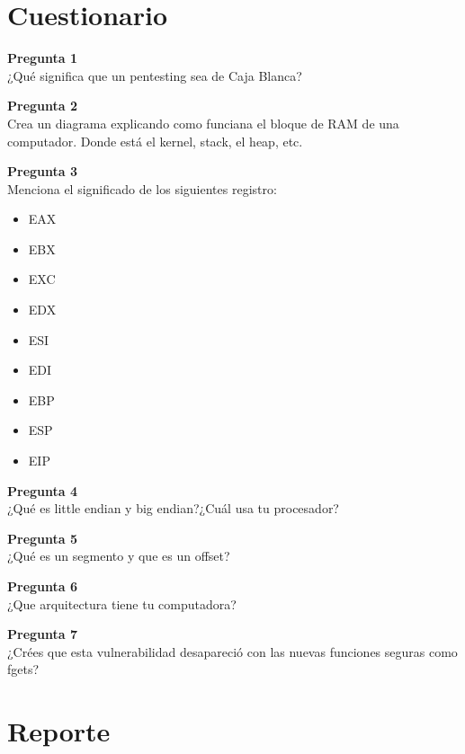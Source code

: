 \documentclass{article}
\newenvironment{problem}[2][Pregunta]
    { \begin{mdframed}[backgroundcolor=gray!20] \textbf{#1 #2} \\}
    {  \end{mdframed}}
\begin{document}
\tableofcontents

\section{Cuestionario}

\begin{problem}{1}
  ¿Qué significa que un pentesting sea de Caja Blanca?
\end{problem}

\begin{problem}{2}
  Crea un diagrama explicando como funciana el bloque de RAM de una computador.
  Donde está el kernel, stack, el heap, etc.
\end{problem}

\begin{problem}{3}
  Menciona el significado de los siguientes registro:

  \begin{itemize}
  \item EAX
  \item EBX
  \item EXC
  \item EDX
  \item ESI
  \item EDI
  \item EBP
  \item ESP
  \item EIP
  \end{itemize}
\end{problem}

\begin{problem}{4}
  ¿Qué es little endian y big endian?¿Cuál usa tu procesador?
\end{problem}

\begin{problem}{5}
  ¿Qué es un segmento y que es un offset?
\end{problem}

\begin{problem}{6}
  ¿Que arquitectura tiene tu computadora?
\end{problem}

\begin{problem}{7}
  ¿Crées que esta vulnerabilidad desapareció con
  las nuevas funciones seguras como fgets?
\end{problem}
\newpage
\section{Reporte}
\end{document}
